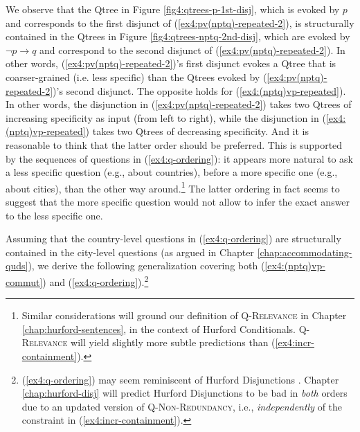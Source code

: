 We observe that the Qtree in Figure \ref{fig4:qtrees-p-1st-disj}, which is evoked by $p$ and corresponds to the first disjunct of (\ref{ex4:pv(nptq)-repeated-2}), is structurally contained in the Qtrees in Figure \ref{fig4:qtrees-nptq-2nd-disj}, which are evoked by $\neg p \rightarrow q$ and correspond to the second disjunct of (\ref{ex4:pv(nptq)-repeated-2}). In other words, (\ref{ex4:pv(nptq)-repeated-2})'s first disjunct evokes a Qtree that is coarser-grained (i.e. less specific) than the Qtrees evoked by (\ref{ex4:pv(nptq)-repeated-2})'s second disjunct. The opposite holds for (\ref{ex4:(nptq)vp-repeated}). In other words, the disjunction in (\ref{ex4:pv(nptq)-repeated-2}) takes two Qtrees of increasing specificity as input (from left to right), while the disjunction in (\ref{ex4:(nptq)vp-repeated}) takes two Qtrees of decreasing specificity. And it is reasonable to think that the latter order should be preferred. This is supported by the sequences of questions in (\ref{ex4:q-ordering}): it appears more natural to ask a less specific question (e.g., about countries), before a more specific one (e.g., about cities), than the other way around.\footnote{Similar considerations will ground our definition of \textsc{Q-Relevance} in Chapter \ref{chap:hurford-sentences}, in the context of Hurford Conditionals. \textsc{Q-Relevance} will yield slightly more subtle predictions than (\ref{ex4:incr-containment}).} The latter ordering in fact seems to suggest that the more specific question would not allow to infer the exact answer to the less specific one.

\begin{exe}
	\ex \label{ex4:q-ordering}
	\begin{xlist}
	\end{xlist}
\end{exe} 

Assuming that the country-level questions in (\ref{ex4:q-ordering}) are structurally contained in the city-level questions (as argued in Chapter \ref{chap:accommodating-quds}), we derive the following generalization covering both (\ref{ex4:(nptq)vp-commut}) and (\ref{ex4:q-ordering}).\footnote{(\ref{ex4:q-ordering}) may seem reminiscent of Hurford Disjunctions \citep{Hurford1974}. Chapter \ref{chap:hurford-disj} will predict Hurford Disjunctions to be bad in \textit{both} orders due to an updated version of \textsc{Q-Non-Redundancy}, i.e., \textit{independently} of the constraint in (\ref{ex4:incr-containment}).}

